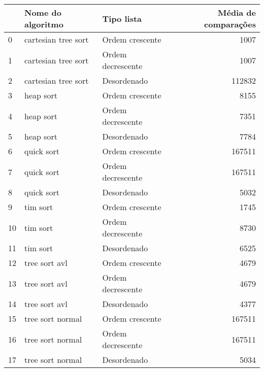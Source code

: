 \begin{tabular}{lllr}
\toprule
{} &    Nome do algoritmo &         Tipo lista &  Média de comparações \\
\midrule
0  &  cartesian tree sort &    Ordem crescente &                  1007 \\
1  &  cartesian tree sort &  Ordem decrescente &                  1007 \\
2  &  cartesian tree sort &        Desordenado &                112832 \\
3  &            heap sort &    Ordem crescente &                  8155 \\
4  &            heap sort &  Ordem decrescente &                  7351 \\
5  &            heap sort &        Desordenado &                  7784 \\
6  &           quick sort &    Ordem crescente &                167511 \\
7  &           quick sort &  Ordem decrescente &                167511 \\
8  &           quick sort &        Desordenado &                  5032 \\
9  &             tim sort &    Ordem crescente &                  1745 \\
10 &             tim sort &  Ordem decrescente &                  8730 \\
11 &             tim sort &        Desordenado &                  6525 \\
12 &        tree sort avl &    Ordem crescente &                  4679 \\
13 &        tree sort avl &  Ordem decrescente &                  4679 \\
14 &        tree sort avl &        Desordenado &                  4377 \\
15 &     tree sort normal &    Ordem crescente &                167511 \\
16 &     tree sort normal &  Ordem decrescente &                167511 \\
17 &     tree sort normal &        Desordenado &                  5034 \\
\bottomrule
\end{tabular}

